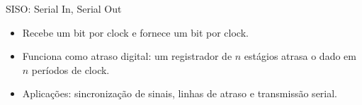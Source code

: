 \begin{frame}{SISO: Serial In, Serial Out}
\begin{itemize}
  \item Recebe um bit por clock e fornece um bit por clock.
  \item Funciona como atraso digital: um registrador de \(n\) estágios atrasa o dado em \(n\) períodos de clock.
  \item Aplicações: sincronização de sinais, linhas de atraso e transmissão serial.
\end{itemize}

\begin{center}
\end{center}
\end{frame}